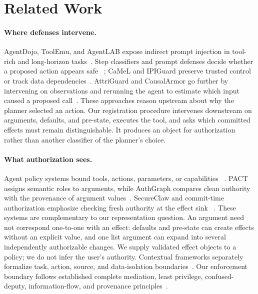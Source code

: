 \section{Related Work}
\label{sec:related-work}

\paragraph{Where defenses intervene.}
AgentDojo, ToolEmu, and AgentLAB expose indirect prompt injection in tool-rich
and long-horizon tasks~\cite{agentdojo,toolemu,agentlab}.  Step classifiers and
prompt defenses decide whether a proposed action appears safe
~\cite{toolsafe,safiron}; CaMeL and IPIGuard preserve trusted control or track
data dependencies~\cite{camel,ipiguard}.  AttriGuard and CausalArmor go further
by intervening on observations and rerunning the agent to estimate which input
caused a proposed call~\cite{attriguard,causalarmor}.  These approaches reason
upstream about why the planner selected an action.  Our registration procedure
intervenes downstream on arguments, defaults, and pre-state, executes the tool,
and asks which committed effects must remain distinguishable.  It produces an
object for authorization rather than another classifier of the planner's
choice.

\paragraph{What authorization sees.}
Agent policy systems bound tools, actions, parameters, or capabilities
~\cite{progent,miniscope,clawguard,scopegate,agentguard}.  PACT assigns semantic
roles to arguments, while AuthGraph compares clean authority with the
provenance of argument values~\cite{pact,authgraph}.  SecureClaw and commit-time
authorization emphasize checking fresh authority at the effect sink
~\cite{secureclaw,committimeauth}.  These systems are complementary to our
representation question.  An argument need not correspond one-to-one with an
effect: defaults and pre-state can create effects without an explicit value,
and one list argument can expand into several independently authorizable
changes.  We supply validated effect objects to a policy; we do not infer the
user's authority.  Contextual frameworks separately formalize task, action,
source, and data-isolation boundaries~\cite{siu2026formalizing}.  Our
enforcement boundary follows established complete
mediation, least privilege, confused-deputy, information-flow, and provenance
principles~\cite{saltzer1975protection,dennis1966programming,hardy1988confused,denning1976lattice,buneman2001why,cheney2009provenance}.

